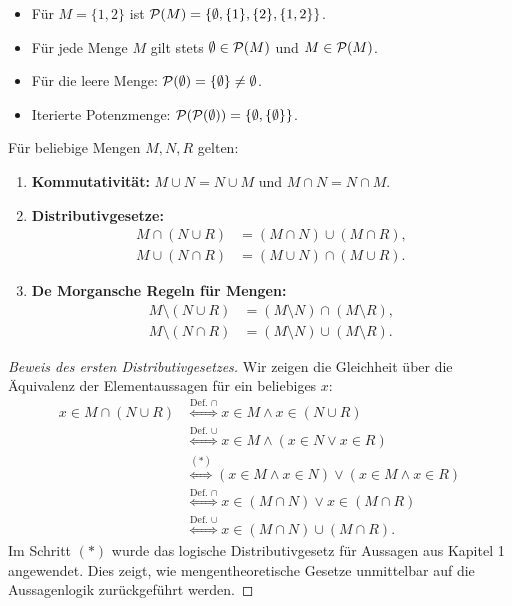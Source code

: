 \begin{beispiel}[Potenzmengen]
\begin{itemize}
    \item Für $M = \{1, 2\}$ ist $\mathcal{P}(M) = \{\emptyset, \{1\}, \{2\}, \{1, 2\}\}$.
    \item Für jede Menge $M$ gilt stets $\emptyset \in \mathcal{P}(M)$ und $M \in \mathcal{P}(M)$.
    \item Für die leere Menge: $\mathcal{P}(\emptyset) = \{\emptyset\} \ne \emptyset$.
    \item Iterierte Potenzmenge: $\mathcal{P}(\mathcal{P}(\emptyset)) = \{\emptyset, \{\emptyset\}\}$.
\end{itemize}
\end{beispiel}

\begin{satz}
Für beliebige Mengen $M, N, R$ gelten:
\begin{enumerate}
    \item \textbf{Kommutativität:} $M \cup N = N \cup M$ und $M \cap N = N \cap M$.
    \item \textbf{Distributivgesetze:}
    \begin{align*}
        M \cap (N \cup R) &= (M \cap N) \cup (M \cap R), \\
        M \cup (N \cap R) &= (M \cup N) \cap (M \cup R).
    \end{align*}
    \item \textbf{De Morgansche Regeln für Mengen:}
    \begin{align*}
        M \setminus (N \cup R) &= (M \setminus N) \cap (M \setminus R), \\
        M \setminus (N \cap R) &= (M \setminus N) \cup (M \setminus R).
    \end{align*}
\end{enumerate}
\end{satz}

\begin{proof}[Beweis des ersten Distributivgesetzes]
Wir zeigen die Gleichheit über die Äquivalenz der Elementaussagen für ein beliebiges $x$:
\begin{align*}
    x \in M \cap (N \cup R)
    &\overset{\text{Def.\ } \cap}{\Longleftrightarrow} x \in M \land x \in (N \cup R) \\
    &\overset{\text{Def.\ } \cup}{\Longleftrightarrow} x \in M \land (x \in N \lor x \in R) \\
    &\overset{(*)}{\Longleftrightarrow} (x \in M \land x \in N) \lor (x \in M \land x \in R) \\
    &\overset{\text{Def.\ } \cap}{\Longleftrightarrow} x \in (M \cap N) \lor x \in (M \cap R) \\
    &\overset{\text{Def.\ } \cup}{\Longleftrightarrow} x \in (M \cap N) \cup (M \cap R).
\end{align*}
Im Schritt $(*)$ wurde das logische Distributivgesetz für Aussagen aus Kapitel 1 angewendet. Dies zeigt, wie mengentheoretische Gesetze unmittelbar auf die Aussagenlogik zurückgeführt werden.
\end{proof}

